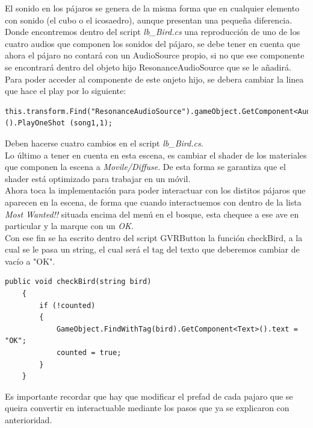 
\quad El sonido en los pájaros se genera de la misma forma que en cualquier elemento con sonido (el cubo o el icosaedro), aunque presentan una pequeña diferencia. Donde encontremos dentro del script \textit{lb\_Bird.cs} una reproducción de uno de los cuatro audios que componen los sonidos del pájaro, se debe tener en cuenta que ahora el pájaro no contará con un AudioSource propio, si no que ese componente se encontrará dentro del objeto hijo ResonanceAudioSource que se le añadirá.\\

\quad Para poder acceder al componente de este onjeto hijo, se debera cambiar la linea que hace el play por lo siguiente:\\

\lstset{language=[sharp]C, breaklines=true, basicstyle=\footnotesize}
\begin{lstlisting}[frame=single, caption={Ejemplo de cambio de audio para pájaro}]
	this.transform.Find("ResonanceAudioSource").gameObject.GetComponent<AudioSource>().PlayOneShot (song1,1);
\end{lstlisting}

\quad Deben hacerse cuatro cambios en el script \textit{lb\_Bird.cs}.\\

\quad Lo último a tener en cuenta en esta escena, es cambiar el shader de los materiales que componen la escena a \textit{Movile/Diffuse}. De esta forma se garantiza que el shader está optimizado para trabajar en un móvil.\\

\quad Ahora toca la implementación para poder interactuar con los distitos pájaros que aparecen en la escena, de forma que cuando interactuemos con dentro de la lista \textit{Most Wanted!!} situada encima del menú en el bosque, esta chequee a ese ave en particular y la marque con un \textit{OK}.\\ 

\quad Con ese fin se ha escrito dentro del script GVRButton la función checkBird, a la cual se le pasa un string, el cual será el tag del texto que deberemos cambiar de vacío a "OK".\\

\begin{lstlisting}[frame=single, caption={función checkBird}]
public void checkBird(string bird)
    {
        if (!counted)
        {
            GameObject.FindWithTag(bird).GetComponent<Text>().text = "OK";
            counted = true;
        }
    }
\end{lstlisting}

\quad Es importante recordar que hay que modificar el prefad de cada pajaro que se queira convertir en interactuable mediante los pasos que ya se explicaron con anterioridad.\\


\newpage



